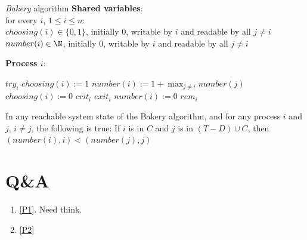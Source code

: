\documentclass[11pt]{article}
\begin{document}
\begin{Block}{\textit{Bakery} algorithm}
\noindent \textbf{Shared variables}:\\
\noindent for every \(i\), \(1\le i\le n\):\\
\indent \(choosing(i)\in\{0,1\}\), initially 0, writable by \(i\) and readable by all \(j\neq i\)\\
\indent \(number(i)\in\N\), initially 0, writable by \(i\) and readable by all \(j\neq i\)

\noindent \textbf{Process \(i\)}:
\begin{algorithm}[H]
\KwRem
\(try_i\)\;
\(choosing(i):=1\)\;
\(number(i):=1+\max_{j\neq i}number(j)\)\;
\(choosing(i):=0\)\;
\(crit_i\)\;
\KwCrit
\(exit_i\)\;
\(number(i):=0\)\;
\(rem_i\)\;
\end{algorithm}
\end{Block}

\begin{lemma}[]
In any reachable system state of the Bakery algorithm, and for any process \(i\) and \(j\), \(i\neq
        j\), the following is true: If \(i\) is in \(C\) and \(j\) is in \((T-D)\cup C\), then \((number(i),i)<(number(j),j)\)
\end{lemma}
\section{Q\&A}
\label{sec:orgf8fac04}
\begin{enumerate}
\item \ref{P1}. Need think.
\item \ref{P2}
\end{enumerate}
\end{document}
